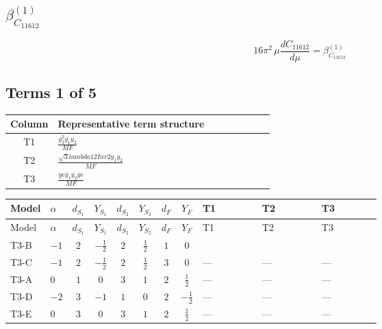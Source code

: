 \documentclass[8pt]{article}
\begin{document}
\begin{landscape}
\section*{$\beta_{C_{11612}}^{(1)}$}
\[16\pi^2\,\mu\frac{d C_{11612}}{d\mu}=\beta_{C_{11612}}^{(1)}\]
\subsection*{Terms 1 of 5}
\begin{center}
\begin{tabular}{@{}c >{\raggedright\arraybackslash}p{0.82\linewidth}@{}}
\toprule
Column & Representative term structure \\
\midrule
T1 & \(\displaystyle \frac{g_{2}^{2} \overline{y_{1}} \overline{y_{2}}}{MF}\) \\
\midrule
T2 & \(\displaystyle \frac{\sqrt{3} lambda12Inv2 \overline{y_{1}} \overline{y_{2}}}{MF}\) \\
\midrule
T3 & \(\displaystyle \frac{ye \overline{y_{1}} \overline{y_{2}} \overline{ye}}{MF}\) \\
\midrule
\bottomrule
\end{tabular}
\end{center}
\smallskip
\tiny
\begin{longtable}{@{}llcccccc >{\raggedright\arraybackslash}p{0.21\linewidth} >{\raggedright\arraybackslash}p{0.21\linewidth} >{\raggedright\arraybackslash}p{0.21\linewidth}@{}}
\toprule
Model & $\alpha$ & $d_{S_1}$ & $Y_{S_1}$ & $d_{S_2}$ & $Y_{S_2}$ & $d_F$ & $Y_F$ & T1 & T2 & T3 \\
\midrule
\endfirsthead
\toprule
Model & $\alpha$ & $d_{S_1}$ & $Y_{S_1}$ & $d_{S_2}$ & $Y_{S_2}$ & $d_F$ & $Y_F$ & T1 & T2 & T3 \\
\midrule
\endhead
T3-B & $-1$ & $2$ & $-\frac{1}{2}$ & $2$ & $\frac{1}{2}$ & $1$ & $0$ & \scriptsize\adjustbox{max width=\linewidth}{$\begin{gathered} - \frac{3 g_{2}^{2} \overline{y_{1}} \overline{y_{2}}}{4 MF}\end{gathered}$} & \scriptsize\adjustbox{max width=\linewidth}{$\begin{gathered} - \frac{\sqrt{3} lambda12Inv2 \overline{y_{1}} \overline{y_{2}}}{3 MF}\end{gathered}$} & \scriptsize\adjustbox{max width=\linewidth}{$\begin{gathered} \frac{ye \overline{y_{1}} \overline{y_{2}} \overline{ye}}{4 MF}\end{gathered}$} \\
\midrule
T3-C & $-1$ & $2$ & $-\frac{1}{2}$ & $2$ & $\frac{1}{2}$ & $3$ & $0$ & --- & --- & --- \\
\midrule
T3-A & $0$ & $1$ & $0$ & $3$ & $1$ & $2$ & $\frac{1}{2}$ & --- & --- & --- \\
\midrule
T3-D & $-2$ & $3$ & $-1$ & $1$ & $0$ & $2$ & $-\frac{1}{2}$ & --- & --- & --- \\
\midrule
T3-E & $0$ & $3$ & $0$ & $3$ & $1$ & $2$ & $\frac{1}{2}$ & --- & --- & --- \\
\midrule
\bottomrule
\end{longtable}
\clearpage

\end{landscape}
\end{document}
